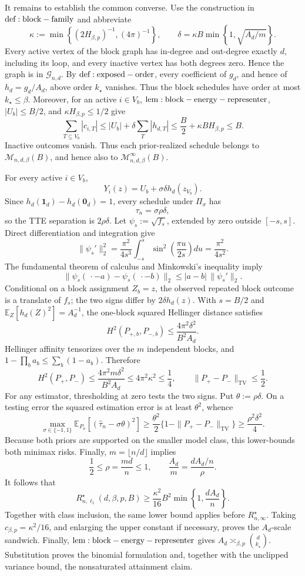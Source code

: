 It remains to establish the common converse. Use the construction in \({\rm def:block-family}\) and abbreviate
\[
\kappa:=\min\!\left\{(2H_{\beta,p})^{-1},(4\pi)^{-1}\right\},
\qquad
\delta=\kappa B\min\!\left\{1,\sqrt{A_d/m}\right\}.
\]
Every active vertex of the block graph has in-degree and out-degree exactly \(d\), including its loop, and every inactive vertex has both degrees zero. Hence the graph is in \(\mathcal G_{n,d}\). By \({\rm def:exposed-order}\), every coefficient of \(g_d\), and hence of \(h_d=g_d/A_d\), above order \(k_\star\) vanishes. Thus the block schedules have order at most \(k_\star\le\beta\). Moreover, for an active \(i\in V_b\), \({\rm lem:block-energy-representer}\), \(|U_b|\le B/2\), and \(\kappa H_{\beta,p}\le1/2\) give
\[
\sum_{T\subseteq V_b}|c_{i,T}|
\le |U_b|+\delta\sum_T|h_{d,T}|
\le\frac B2+\kappa BH_{\beta,p}
\le B.
\]
Inactive outcomes vanish. Thus each prior-realized schedule belongs to \(\mathcal M_{n,d,\beta}(B)\), and hence also to \(\mathcal M_{n,d,\beta}^{\infty}(B)\).

For every active \(i\in V_b\),
\[
Y_i(z)=U_b+\sigma\delta h_d(z_{V_b}).
\]
Since \(h_d(\mathbf1_d)-h_d(\mathbf0_d)=1\), every schedule under \(\Pi_\sigma\) has
\[
\tau_n=\sigma\rho\delta,
\]
so the TTE separation is \(2\rho\delta\). Let \(\psi_s:=\sqrt{f_s}\), extended by zero outside \([-s,s]\). Direct differentiation and integration give
\[
\|\psi_s'\|_2^2
=\frac{\pi^2}{4s^3}\int_{-s}^{s}
\sin^2\!\left(\frac{\pi u}{2s}\right)du
=\frac{\pi^2}{4s^2}.
\]
The fundamental theorem of calculus and Minkowski's inequality imply
\[
\|\psi_s(\,\cdot-a)-\psi_s(\,\cdot-b)\|_2
\le|a-b|\,\|\psi_s'\|_2.
\]
Conditional on a block assignment \(Z_b=z\), the observed repeated block outcome is a translate of \(f_s\); the two signs differ by \(2\delta h_d(z)\). With \(s=B/2\) and \(\mathbb E_Z[h_d(Z)^2]=A_d^{-1}\), the one-block squared Hellinger distance satisfies
\[
H^2(P_{+,b},P_{-,b})
\le\frac{4\pi^2\delta^2}{B^2A_d}.
\]
Hellinger affinity tensorizes over the \(m\) independent blocks, and \(1-\prod_b a_b\le\sum_b(1-a_b)\). Therefore
\[
H^2(P_+,P_-)
\le\frac{4\pi^2m\delta^2}{B^2A_d}
\le4\pi^2\kappa^2
\le\frac14,
\qquad
\|P_+-P_-\|_{\mathrm{TV}}\le\frac12.
\]
For any estimator, thresholding at zero tests the two signs. Put \(\theta:=\rho\delta\). On a testing error the squared estimation error is at least \(\theta^2\), whence
\[
\max_{\sigma\in\{-1,1\}}
\mathbb E_{P_\sigma}[(\widehat\tau_n-\sigma\theta)^2]
\ge\frac{\theta^2}{2}
\{1-\|P_+-P_-\|_{\mathrm{TV}}\}
\ge\frac{\rho^2\delta^2}{4}.
\]
Because both priors are supported on the smaller model class, this lower-bounds both minimax risks. Finally, \(m=\lfloor n/d\rfloor\) implies
\[
\frac12\le\rho=\frac{md}{n}\le1,
\qquad
\frac{A_d}{m}=\frac{dA_d/n}{\rho}.
\]
It follows that
\[
R_{n,\ell_1}^\star(d,\beta,p,B)
\ge\frac{\kappa^2}{16}B^2
\min\!\left\{1,\frac{dA_d}{n}\right\}.
\]
Together with class inclusion, the same lower bound applies before \(R_{n,\infty}^\star\). Taking \(c_{\beta,p}=\kappa^2/16\), and enlarging the upper constant if necessary, proves the \(A_d\)-scale sandwich. Finally, \({\rm lem:block-energy-representer}\) gives \(A_d\asymp_{\beta,p}\binom d{k_\star}\). Substitution proves the binomial formulation and, together with the unclipped variance bound, the nonsaturated attainment claim.